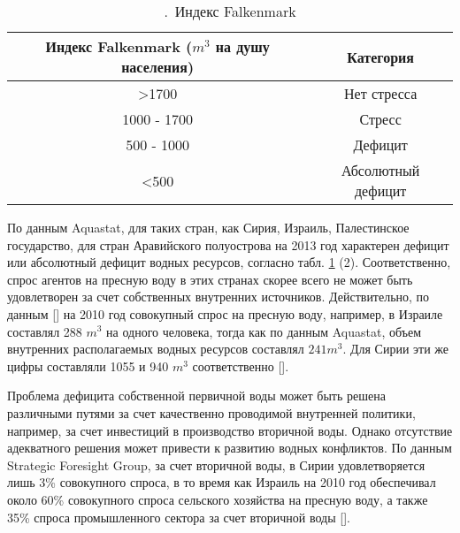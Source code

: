 \documentclass[a4paper, 12pt]{article}
\theoremstyle{plain} %
\theoremstyle{definition} %
\theoremstyle{remark} %
\begin{document}
\begin{table}[]
\centering
\caption{.\, Индекс Falkenmark}
\label{falkenmark_table}
\begin{tabular}{|c|c|}
	\hline
	\textbf{Индекс Falkenmark ($m^3$ на душу населения)} & \textbf{Категория}         \\ \hline
	\textgreater1700                                          & Нет стресса        \\ \hline
	1000 - 1700                                               & Стресс             \\ \hline
	500 - 1000                                                & Дефицит            \\ \hline
	\textless500                                              & Абсолютный дефицит \\ \hline
\end{tabular}
\end{table}
По данным Aquastat, для таких стран, как Сирия, Израиль, Палестинское государство, для стран Аравийского полуострова на 2013 год характерен дефицит или абсолютный дефицит водных ресурсов, согласно табл. \ref{falkenmark_table} (2). Соответственно, спрос агентов на пресную воду в этих странах скорее всего не может быть удовлетворен за счет собственных внутренних источников. Действительно, по данным [\cite{stategic_middle}] на 2010 год совокупный спрос на пресную воду, например, в Израиле составлял 288 $m^3$ на одного человека, тогда как по данным Aquastat, объем внутренних располагаемых водных ресурсов составлял $241 m^3$. Для Сирии эти же цифры составляли 1055 и 940 $m^3$ соответственно [\cite{stategic_middle}].

Проблема дефицита собственной первичной воды может быть решена различными путями за счет качественно проводимой внутренней политики, например, за счет инвестиций в производство вторичной воды. Однако отсутствие адекватного решения может привести к развитию водных конфликтов. По данным Strategic Foresight Group, за счет вторичной воды, в Сирии удовлетворяется лишь 3\% совокупного спроса, в то время как Израиль на 2010 год обеспечивал около 60\% совокупного спроса сельского хозяйства на пресную воду, а также 35\% спроса промышленного сектора за счет вторичной воды [\cite{stategic_middle}].
\end{document}
